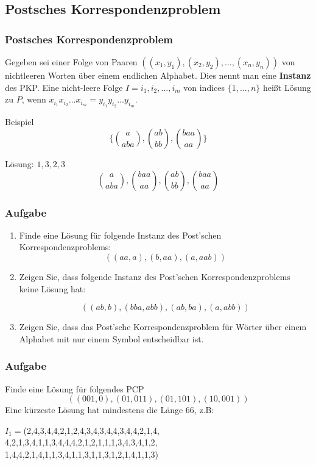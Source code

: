 \documentclass{beamer}
\begin{document}
{\subsection{Postsches Korrespondenzproblem}
\begin{frame}
\frametitle{Postsches Korrespondenzproblem}
Gegeben sei einer Folge von Paaren $((x_1, y_1), (x_2, y_2), \ldots, (x_n,y_n))$ von nichtleeren Worten über einem endlichen Alphabet. Dies nennt man eine \textbf{Instanz} des PKP.
Eine nicht-leere Folge $I = i_1, i_2, \ldots, i_m$ von indices $\{1, \ldots, n\}$ heißt Lösung zu $P$, wenn $x_{i_1}x_{i_2}\ldots{}x_{i_m} = y_{i_1}y_{i_2}\ldots{}y_{i_m}$.
\begin{block}{Beispiel}
\begin{displaymath}
\{ {a \choose aba}, {ab \choose bb}, {baa \choose aa} \}
\end{displaymath}

Lösung: $1,3,2,3$
\begin{displaymath}
{a \choose aba}, {baa \choose aa}, {ab \choose bb}, {baa \choose aa}
\end{displaymath}

\end{block}
\end{frame}

\begin{frame}
\frametitle{Aufgabe}
\begin{enumerate}
\item Finde eine Lösung für folgende Instanz des Post'schen Korrespondenzproblems: 
\[ ((aa, a), (b, aa), (a, aab)) \]
  \item Zeigen Sie, dass folgende Instanz des Post'schen Korrespondenzproblems
        keine Lösung hat:

        \[ ((ab, b), (bba, abb), (ab, ba), (a, abb)) \]

  \item Zeigen Sie, dass das Post'sche Korrespondenzproblem für Wörter
über einem Alphabet mit nur einem Symbol entscheidbar ist.
\end{enumerate}
\end{frame}

\begin{frame}
\frametitle{Aufgabe}
Finde eine Lösung für folgendes PCP
$$ ((001,0),(01,011),(01,101),(10,001)) $$
\pause
Eine kürzeste Lösung hat mindestens die Länge 66, z.B:
\begin{center}
$ I_1 = $(2,4,3,4,4,2,1,2,4,3,4,3,4,4,3,4,4,2,1,4,\\
4,2,1,3,4,1,1,3,4,4,4,2,1,2,1,1,1,3,4,3,4,1,2,\\
1,4,4,2,1,4,1,1,3,4,1,1,3,1,1,3,1,2,1,4,1,1,3)
\end{center}
\end{frame}

}
\end{document}
